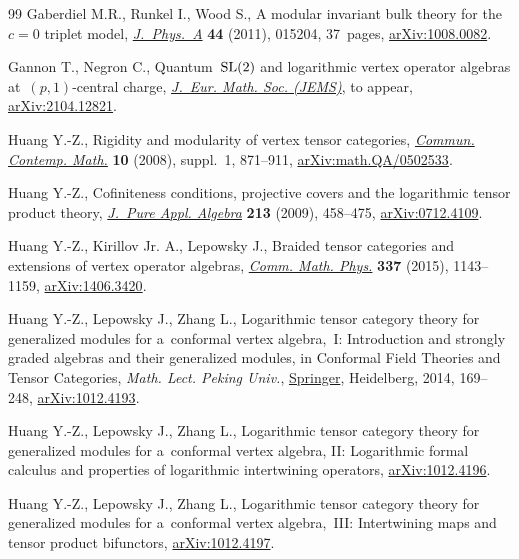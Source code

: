 \documentclass[pdftex]{sigma}
\numberwithin{equation}{section}
\theoremstyle{definition}
\begin{document}
\begin{thebibliography}{99}
Gaberdiel M.R., Runkel I., Wood S., A modular invariant bulk theory for
 the~{$c=0$} triplet model,
 \href{https://doi.org/10.1088/1751-8113/44/1/015204}{\textit{J.~Phys.~A}}
 \textbf{44} (2011), 015204, 37~pages,
 \href{http://arxiv.org/abs/1008.0082}{arXiv:1008.0082}.

Gannon T., Negron C., Quantum~${\rm SL}(2)$ and logarithmic vertex operator algebras
 at~$(p,1)$-central charge,
 \href{https://doi.org/10.4171/JEMS/1489}{\textit{J.~Eur. Math. Soc. (JEMS)}}, {t}o appear, \href{http://arxiv.org/abs/2104.12821}{arXiv:2104.12821}.

Huang Y.-Z., Rigidity and modularity of vertex tensor categories,
 \href{https://doi.org/10.1142/S0219199708003083}{\textit{Commun. Contemp.
 Math.}} \textbf{10} (2008), suppl.~1, 871--911,
 \href{http://arxiv.org/abs/math.QA/0502533}{arXiv:math.QA/0502533}.

Huang Y.-Z., Cofiniteness conditions, projective covers and the logarithmic
 tensor product theory,
 \href{https://doi.org/10.1016/j.jpaa.2008.07.016}{\textit{J.~Pure Appl.
 Algebra}} \textbf{213} (2009), 458--475,
 \href{http://arxiv.org/abs/0712.4109}{arXiv:0712.4109}.

Huang Y.-Z., Kirillov Jr. A., Lepowsky J., Braided tensor categories and
 extensions of vertex operator algebras,
 \href{https://doi.org/10.1007/s00220-015-2292-1}{\textit{Comm. Math. Phys.}}
 \textbf{337} (2015), 1143--1159,
 \href{http://arxiv.org/abs/1406.3420}{arXiv:1406.3420}.

Huang Y.-Z., Lepowsky J., Zhang L., Logarithmic tensor category theory for
 generalized modules for a~conformal vertex algebra,~{I}: {I}ntroduction and
 strongly graded algebras and their generalized modules, in Conformal {F}ield
 {T}heories and {T}ensor {C}ategories, \textit{Math. Lect. Peking Univ.},
 \href{https://doi.org/10.1007/978-3-642-39383-9}{Springer}, Heidelberg, 2014,
 169--248, \href{http://arxiv.org/abs/1012.4193}{arXiv:1012.4193}.

Huang Y.-Z., Lepowsky J., Zhang L., Logarithmic tensor category theory for
 generalized modules for a~conformal vertex algebra, {II}: {L}ogarithmic
 formal calculus and properties of logarithmic intertwining operators,
 \href{http://arxiv.org/abs/1012.4196}{arXiv:1012.4196}.

Huang Y.-Z., Lepowsky J., Zhang L., Logarithmic tensor category theory for
 generalized modules for a~conformal vertex algebra,~{III}: {I}ntertwining
 maps and tensor product bifunctors,
 \href{http://arxiv.org/abs/1012.4197}{arXiv:1012.4197}.


\end{thebibliography}
\end{document}
